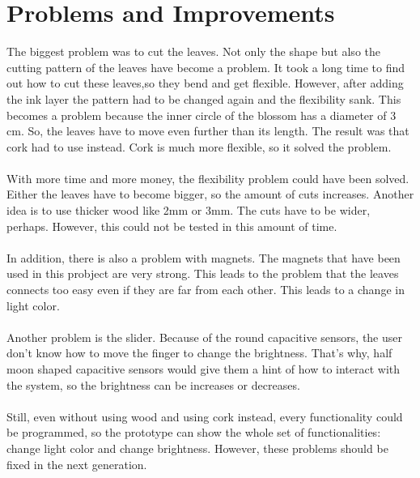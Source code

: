 \documentclass[00_doc.tex]{subfiles}
\begin{document}
    \section{Problems and Improvements}
    \begin{flushleft}
        The biggest problem was to cut the leaves. Not only the shape but also the cutting pattern 
        of the leaves have become a problem. It took a long time to find out how to cut these 
        leaves,so they bend and get flexible. However, after adding the ink layer the pattern had 
        to be changed again and the flexibility sank. This becomes a problem because the inner 
        circle of the blossom has a diameter of 3 cm. So, the leaves have to move even further than 
        its length. The result was that cork had to use instead. Cork is much more flexible, so it 
        solved the problem. \\~\\
        
        With more time and more money, the flexibility problem could have been solved. Either the 
        leaves have to become bigger, so the amount of cuts increases. Another idea is to use 
        thicker wood like 2mm or 3mm. The cuts have to be wider, perhaps. However, this could not 
        be tested in this amount of time.\\~\\

        In addition, there is also a problem with magnets. The magnets that have been used in this 
        probject are very strong. This leads to the problem that the leaves connects too easy even if 
        they are far from each other. This leads to a change in light color.\\~\\

        Another problem is the slider. Because of the round capacitive sensors, the user don't
        know how to move the finger to change the brightness. That's why, half moon shaped capacitive 
        sensors would give them a hint of how to interact with the system, so the brightness can be 
        increases or decreases.\\~\\
        
        Still, even without using wood and using cork instead, every functionality could be 
        programmed, so the prototype can show the whole set of functionalities: change light color 
        and change brightness. However, these problems should be fixed in the next generation.
    \end{flushleft}
\end{document}
